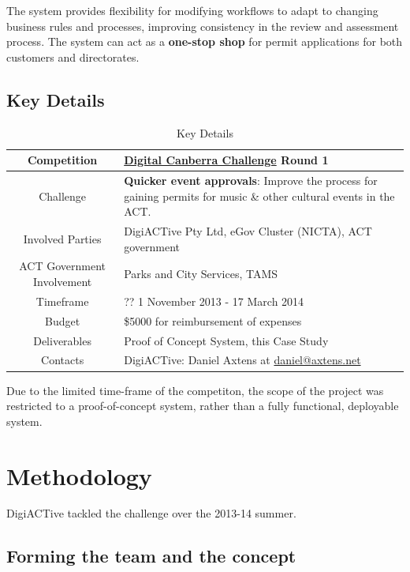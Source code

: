 \documentclass[12pt,a4paper,twosided]{article}
\begin{document}
The system provides flexibility for modifying workflows to adapt to
changing business rules and processes, improving consistency in the
review and assessment process. The system can act as a \textbf{one-stop
shop} for permit applications for both customers and directorates.

\subsection{Key Details}


\begin{table}[h!]
  \centering
  \begin{tabular}{|c|l|}
    \hline
Competition & \href{http://digitalcanberrachallenge.com.au}{Digital Canberra Challenge} Round 1 \\ \hline
Challenge & \textbf{Quicker event approvals}: Improve the process for gaining permits for music \& other cultural events in the ACT. \\ \hline
Involved Parties & DigiACTive Pty Ltd, eGov Cluster (NICTA), ACT
government \\ \hline
ACT Government Involvement & Parks and City Services, TAMS \\ \hline
Timeframe & ?? 1 November 2013 - 17 March 2014 \\ \hline
Budget & \$5000 for reimbursement of expenses \\ \hline
Deliverables & Proof of Concept System, this Case Study \\ \hline
Contacts & DigiACTive: Daniel Axtens at
\href{mailto:daniel@axtens.net}{\href{mailto:daniel@axtens.net}{daniel@axtens.net}} \\ \hline
  \end{tabular}
  \caption{Key Details}
  \label{tab:keydetails}
\end{table}

Due to the limited time-frame of the competiton, the scope of the project was restricted to a proof-of-concept system, rather than a fully functional, deployable system.


\newpage
\section{Methodology}

DigiACTive tackled the challenge over the 2013-14 summer.

\subsection{Forming the team and the concept}
\end{document}
